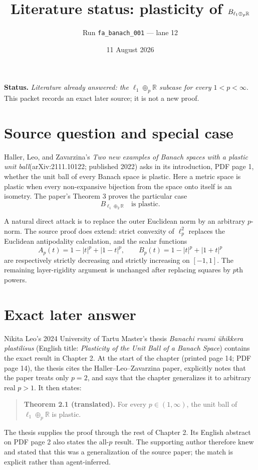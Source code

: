 \documentclass[11pt]{article}
\title{Literature status: plasticity of $B_{\ell_1\oplus_p\R}$}
\author{Run \texttt{fa\_banach\_001} --- lane 12}
\date{11 August 2026}
\newcommand{\R}{\mathbb R}
\begin{document}
\maketitle

\noindent\textbf{Status.}
\emph{Literature already answered: the $\ell_1\oplus_p\R$ subcase for every
$1<p<\infty$}.  This packet records an exact later source; it is not a new
proof.

\section{Source question and special case}

Haller, Leo, and Zavarzina's \emph{Two new examples of Banach spaces with a
plastic unit ball}\linebreak (arXiv:2111.10122; published 2022) asks in its introduction,
PDF page 1, whether the unit ball of every Banach space is plastic.  Here a
metric space is plastic when every non-expansive bijection from the space onto
itself is an isometry.  The paper's Theorem 3 proves the particular case
\[
 B_{\ell_1\oplus_2\R}\quad\text{is plastic}.
\]

A natural direct attack is to replace the outer Euclidean norm by an arbitrary
$p$-norm.  The source proof does extend: strict convexity of $\ell_p^2$
replaces the Euclidean antipodality calculation, and the scalar functions
\[
 A_p(t)=1-|t|^p+|1-t|^p,\qquad
 B_p(t)=1-|t|^p+|1+t|^p
\]
are respectively strictly decreasing and strictly increasing on $[-1,1]$.
The remaining layer-rigidity argument is unchanged after replacing squares by
$p$th powers.

\section{Exact later answer}

Nikita Leo's 2024 University of Tartu Master's thesis
\emph{Banachi ruumi \"uhikkera plastilisus} (English title: \emph{Plasticity
of the Unit Ball of a Banach Space}) contains the exact result in Chapter 2.
At the start of the chapter (printed page 14; PDF page 14), the thesis cites
the Haller--Leo--Zavarzina paper, explicitly notes that the paper treats only
$p=2$, and says that the chapter generalizes it to arbitrary real $p>1$.
It then states:
\begin{quote}
\textbf{Theorem 2.1 (translated).} For every $p\in(1,\infty)$, the unit ball
of $\ell_1\oplus_p\R$ is plastic.
\end{quote}
The thesis supplies the proof through the rest of Chapter 2.  Its English
abstract on PDF page 2 also states the all-$p$ result.  The supporting author
therefore knew and stated that this was a generalization of the source paper;
the match is explicit rather than agent-inferred.
\end{document}
